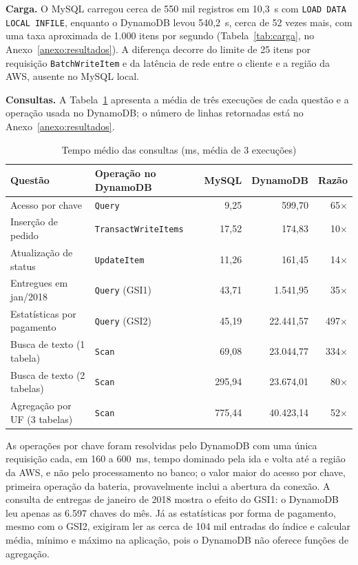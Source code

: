 \documentclass[12pt]{article}
\begin{document}
\textbf{Carga.} O MySQL carregou cerca de 550 mil registros em 10,3~s com
\texttt{LOAD DATA LOCAL INFILE}, enquanto o DynamoDB levou 540,2~s, cerca de
52 vezes mais, com uma taxa aproximada de 1.000 itens por segundo
(Tabela~\ref{tab:carga}, no Anexo~\ref{anexo:resultados}). A diferença decorre
do limite de 25 itens por requisição \texttt{BatchWriteItem} e da latência de
rede entre o cliente e a região da AWS, ausente no MySQL local.

\textbf{Consultas.} A Tabela~\ref{tab:consultas} apresenta a média de três
execuções de cada questão e a operação usada no DynamoDB; o número de linhas
retornadas está no Anexo~\ref{anexo:resultados}.

\begin{table}[htbp]
\centering
\caption{Tempo médio das consultas (ms, média de 3 execuções)}
\label{tab:consultas}
\footnotesize
\begin{tabular}{|l|l|r|r|r|}
\hline
\textbf{Questão} & \textbf{Operação no DynamoDB} & \textbf{MySQL} & \textbf{DynamoDB} & \textbf{Razão} \\ \hline
Acesso por chave             & \texttt{Query}             & 9,25   & 599,70    & 65$\times$  \\ \hline
Inserção de pedido           & \texttt{TransactWriteItems}& 17,52  & 174,83    & 10$\times$  \\ \hline
Atualização de status        & \texttt{UpdateItem}        & 11,26  & 161,45    & 14$\times$  \\ \hline
Entregues em jan/2018        & \texttt{Query} (GSI1)      & 43,71  & 1.541,95  & 35$\times$  \\ \hline
Estatísticas por pagamento   & \texttt{Query} (GSI2)      & 45,19  & 22.441,57 & 497$\times$ \\ \hline
Busca de texto (1 tabela)    & \texttt{Scan}              & 69,08  & 23.044,77 & 334$\times$ \\ \hline
Busca de texto (2 tabelas)   & \texttt{Scan}              & 295,94 & 23.674,01 & 80$\times$  \\ \hline
Agregação por UF (3 tabelas) & \texttt{Scan}              & 775,44 & 40.423,14 & 52$\times$  \\ \hline
\end{tabular}
\end{table}


As operações por chave foram resolvidas pelo DynamoDB com uma única
requisição cada, em 160 a 600~ms, tempo dominado pela ida e volta até a região
da AWS, e não pelo processamento no banco; o valor maior do acesso por chave,
primeira operação da bateria, provavelmente inclui a abertura da conexão. A
consulta de entregas de janeiro de 2018 mostra o efeito do GSI1: o DynamoDB
leu apenas as 6.597 chaves do mês. Já as estatísticas por forma de pagamento,
mesmo com o GSI2, exigiram ler as cerca de 104 mil entradas do índice e
calcular média, mínimo e máximo na aplicação, pois o DynamoDB não oferece
funções de agregação.
\end{document}
